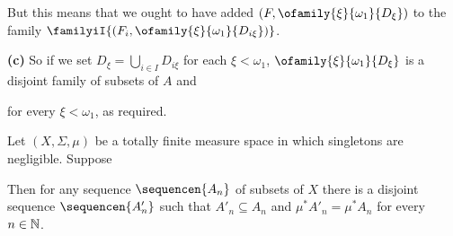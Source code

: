 {

\noindent But this means that we ought to have added
$(F,\ofamily{\xi}{\omega_1}{D_{\xi}})$ to the family
$\familyiI{(F_i,\ofamily{\xi}{\omega_1}{D_{i\xi}})}$.\ \Bang\Qed

\medskip

{\bf (c)} So if we set
$D_{\xi}=\bigcup_{i\in I}D_{i\xi}$ for each $\xi<\omega_1$,
$\ofamily{\xi}{\omega_1}{D_{\xi}}$ is a disjoint family of subsets of $A$
and


\noindent for every $\xi<\omega_1$, as required.
}%

 Let
$(X,\Sigma,\mu)$ be a totally finite measure space in which singletons
are negligible.   Suppose


\noindent
Then for any sequence $\sequencen{A_n}$ of subsets of $X$ there is a
disjoint sequence $\sequencen{A'_n}$ such that $A'_n\subseteq A_n$
and $\mu^*A'_n=\mu^*A_n$ for every $n\in\Bbb N$.

